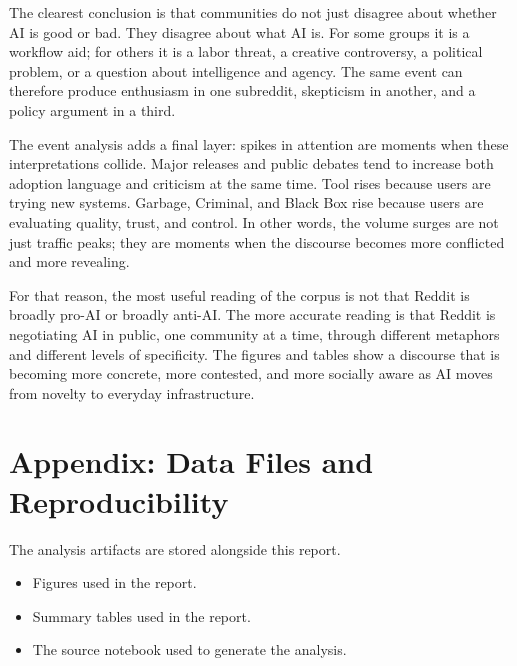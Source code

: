 \documentclass[11pt]{article}
\begin{document}
The clearest conclusion is that communities do not just disagree about whether AI is good or bad. They disagree about what AI is. For some groups it is a workflow aid; for others it is a labor threat, a creative controversy, a political problem, or a question about intelligence and agency. The same event can therefore produce enthusiasm in one subreddit, skepticism in another, and a policy argument in a third.

The event analysis adds a final layer: spikes in attention are moments when these interpretations collide. Major releases and public debates tend to increase both adoption language and criticism at the same time. Tool rises because users are trying new systems. Garbage, Criminal, and Black Box rise because users are evaluating quality, trust, and control. In other words, the volume surges are not just traffic peaks; they are moments when the discourse becomes more conflicted and more revealing.

For that reason, the most useful reading of the corpus is not that Reddit is broadly pro-AI or broadly anti-AI. The more accurate reading is that Reddit is negotiating AI in public, one community at a time, through different metaphors and different levels of specificity. The figures and tables show a discourse that is becoming more concrete, more contested, and more socially aware as AI moves from novelty to everyday infrastructure.

\section{Appendix: Data Files and Reproducibility}
The analysis artifacts are stored alongside this report.
\begin{itemize}
  \item Figures used in the report.
  \item Summary tables used in the report.
  \item The source notebook used to generate the analysis.
\end{itemize}
\end{document}
